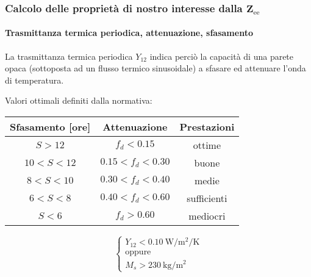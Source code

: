 \documentclass[aspectratio=141,10pt]{beamer}
\begin{document}
\begin{frame}
    \frametitle{Calcolo delle proprietà di nostro interesse dalla $\mathbf{Z}_{\text{ee}}$}
    \framesubtitle{Trasmittanza termica periodica, attenuazione, sfasamento}
    La trasmittanza termica periodica $Y_{12}$ indica perciò la capacità di una parete opaca (sottoposta ad un flusso termico sinusoidale) a sfasare ed attenuare l'onda di temperatura.
    \vspace{1cm}

    Valori ottimali definiti dalla normativa:
    \vspace{0.5cm}

    \begin{table}
    \centering
    \begin{tabular}{ccc}
        \toprule 
        Sfasamento [ore] & Attenuazione & Prestazioni \\
        \midrule
        $S > 12$& $f_d < 0.15$&ottime\\
        $10 < S < 12$&$0.15 < f_d < 0.30$&buone\\
        $8 < S < 10$&$0.30 < f_d < 0.40$&medie\\
        $6 < S < 8$&$0.40 < f_d < 0.60$&sufficienti\\
        $S < 6$&$f_d > 0.60$&mediocri\\
        \bottomrule
    \end{tabular}
    \end{table}
\vspace{1cm
}
    \begin{equation*}
        \begin{cases}
            Y_{12} < \SI{0.10}{\watt\per\metre\squared\per\kelvin} \\
            \text{oppure}\\
            M_s > \SI{230}{\kilo\gram\per\metre\squared}
        \end{cases}
    \end{equation*}

\end{frame}
\end{document}
